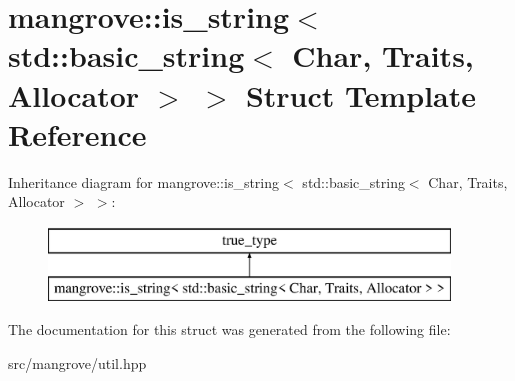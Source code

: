\hypertarget{structmangrove_1_1is__string_3_01std_1_1basic__string_3_01Char_00_01Traits_00_01Allocator_01_4_01_4}{}\section{mangrove\+:\+:is\+\_\+string$<$ std\+:\+:basic\+\_\+string$<$ Char, Traits, Allocator $>$ $>$ Struct Template Reference}
\label{structmangrove_1_1is__string_3_01std_1_1basic__string_3_01Char_00_01Traits_00_01Allocator_01_4_01_4}
Inheritance diagram for mangrove\+:\+:is\+\_\+string$<$ std\+:\+:basic\+\_\+string$<$ Char, Traits, Allocator $>$ $>$\+:\begin{figure}[H]
\begin{center}
\leavevmode
\includegraphics[height=2.000000cm]{structmangrove_1_1is__string_3_01std_1_1basic__string_3_01Char_00_01Traits_00_01Allocator_01_4_01_4}
\end{center}
\end{figure}


The documentation for this struct was generated from the following file\+:\begin{DoxyCompactItemize}
\item 
src/mangrove/util.\+hpp\end{DoxyCompactItemize}

